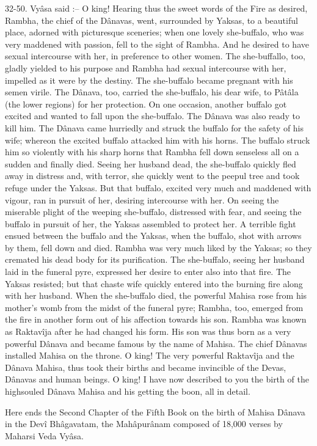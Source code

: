 32-50. Vy\^asa said :-- O king! Hearing thus the sweet words of the Fire as desired, Rambha, the chief of the D\^anavas, went, surrounded by Yaksas, to a beautiful place, adorned with picturesque sceneries; when one lovely she-buffalo, who was very maddened with passion, fell to the sight of Rambha. And he desired to have sexual intercourse with her, in preference to other women. The she-buffallo, too, gladly yielded to his purpose and Rambha had sexual intercourse with her, impelled as it were by the destiny. The she-buffalo became pregnant with his semen virile. The D\^anava, too, carried the she-buffalo, his dear wife, to P\^at\^ala (the lower regions) for her protection. On one occasion, another buffalo got excited and wanted to fall upon the she-buffalo. The D\^anava was also ready to kill him. The D\^anava came hurriedly and struck the buffalo for the safety of his wife; whereon the excited buffalo attacked him with his horns. The buffalo struck him so violently with his sharp horns that Rambha fell down senseless all on a sudden and finally died. Seeing her husband dead, the she-buffalo quickly fled away in distress and, with terror, she quickly went to the peepul tree and took refuge under the Yaksas. But that buffalo, excited very much and maddened with vigour, ran in pursuit of her, desiring intercourse with her. On seeing the miserable plight of the weeping she-buffalo, distressed with fear, and seeing the buffalo in pursuit of her, the Yaksas assembled to protect her. A terrible fight ensued between the buffalo and the Yaksas, when the buffalo, shot with arrows by them, fell down and died. Rambha was very much liked by the Yaksas; so they cremated his dead body for its purification. The she-buffalo, seeing her husband laid in the funeral pyre, expressed her desire to enter also into that fire. The Yaksas resisted; but that chaste wife quickly entered into the burning fire along with her husband. When the she-buffalo died, the powerful Mahisa rose from his mother's womb from the midst of the funeral pyre; Rambha, too, emerged from the fire in another form out of his affection towards his son. Rambha was known as Raktav\^ija after he had changed his form. His son was thus born as a very powerful D\^anava and became famous by the name of Mahisa. The chief D\^anavas installed Mahisa on the throne. O king! The very powerful Raktav\^ija and the D\^anava Mahisa, thus took their births and became invincible of the Devas, D\^anavas and human beings. O king! I have now described to you the birth of the highsouled D\^anava Mahisa and his getting the boon, all in detail.

Here ends the Second Chapter of the Fifth Book on the birth of Mahisa D\^anava in the Dev\^i Bh\^agavatam, the Mah\^apur\^anam composed of 18,000 verses by Maharsi Veda Vy\^asa.